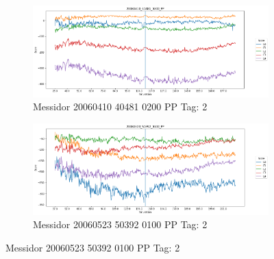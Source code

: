 \begin{figure}[ht!]
	\centering
	\begin{subfigure}[b]{ 0.85\textwidth}
		\centering
		\includegraphics[width=\textwidth]{Figures/chapter_stability/20060410_40481_0200_PP/s/scores.png}
		\caption{Messidor 20060410 40481 0200 PP Tag: 2}		
	\end{subfigure}
	\begin{subfigure}[b]{ 0.85\textwidth}
		\centering
		\includegraphics[width=\textwidth]{Figures/chapter_stability/20060523_50392_0100_PP/s/scores.png}
		\caption{Messidor 20060523 50392 0100 PP Tag: 2}		
	\end{subfigure}
	

\end{figure}

